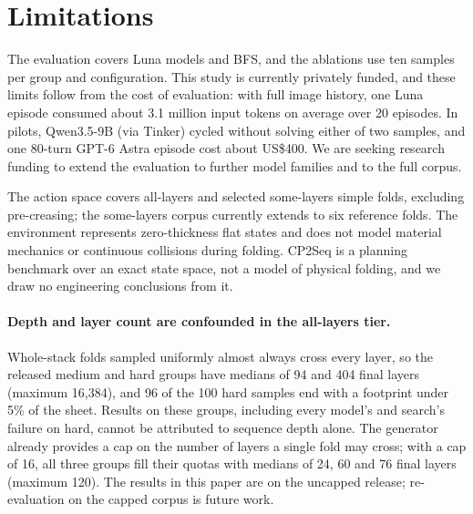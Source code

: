 \section{Limitations}
\label{sec:limitations}

The evaluation covers Luna models and BFS, and the ablations use ten samples per group and
configuration. This study is currently privately funded, and these limits follow from the cost of
evaluation: with full image history, one Luna episode consumed about 3.1 million input tokens on
average over 20 episodes. In pilots, Qwen3.5-9B (via Tinker) cycled without solving either of two samples, and one
80-turn GPT-6 Astra episode cost about US\$400. We are seeking research funding to extend the evaluation to further
model families and to the full corpus.

The action space covers all-layers and selected some-layers simple folds, excluding
pre-creasing; the some-layers corpus currently extends to six reference folds. The environment
represents zero-thickness flat states and does not model material mechanics or continuous
collisions during folding. CP2Seq is a planning benchmark over an exact state space, not a model
of physical folding, and we draw no engineering conclusions from it.

\paragraph{Depth and layer count are confounded in the all-layers tier.} Whole-stack folds sampled
uniformly almost always cross every layer, so the released medium and hard groups have medians of
94 and 404 final layers (maximum 16,384), and 96 of the 100 hard samples end with a footprint under
5\% of the sheet. Results on these groups, including every model's and search's failure on hard,
cannot be attributed to sequence depth alone. The generator already provides a cap on the number
of layers a single fold may cross; with a cap of 16, all three groups fill their quotas with medians
of 24, 60 and 76 final layers (maximum 120). The results in this paper are on the uncapped release;
re-evaluation on the capped corpus is future work.

